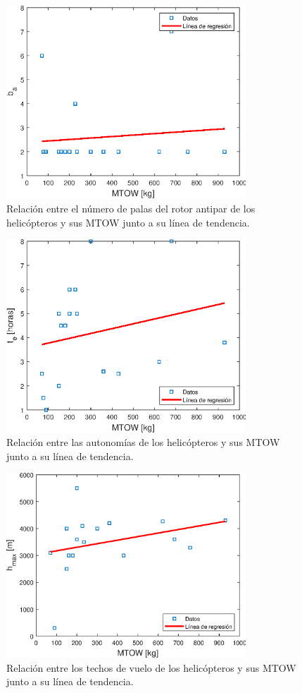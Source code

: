 \begin{figure}
	\centering
	\includegraphics[width=90mm]{graficos/analbtr}
	\caption{Relación entre el número de palas del rotor antipar de los helicópteros y sus MTOW junto a su línea de tendencia.}
	\label{baAS}
\end{figure}
\begin{figure}
	\centering
	\includegraphics[width=90mm]{graficos/analaut}
	\caption{Relación entre las autonomías de los helicópteros y sus MTOW junto a su línea de tendencia.}
	\label{autAS}
\end{figure}
\begin{figure}
	\centering
	\includegraphics[width=90mm]{graficos/analtecho}
	\caption{Relación entre los techos de vuelo de los helicópteros y sus MTOW junto a su línea de tendencia.}
	\label{techoAS}
\end{figure}
